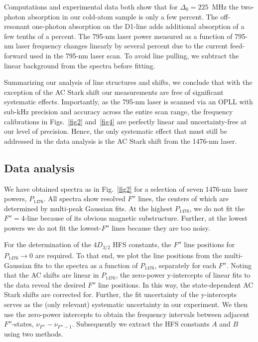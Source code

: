 \documentclass[reprint, amsmath,amssymb, aps, pra, longbibliography]{revtex4-1}
\begin{document}
Computations and experimental data both show that for $\Delta_0=225$~MHz the two-photon absorption in our cold-atom sample is only a few percent. The off-resonant one-photon absorption on the D1-line adds additional absorption of a few tenths of a percent. The 795-nm laser power measured as a function of 795-nm laser frequency changes linearly by several percent due to the current feed-forward used in the 795-nm laser scan. To avoid line pulling, we subtract the linear background from the spectra before fitting. 

Summarizing our analysis of line structures and shifts, we conclude that with the
exception of the AC Stark shift our measurements are free of significant systematic effects.
Importantly, as the 795-nm laser is scanned via an OPLL with sub-kHz precision and accuracy across the entire scan range, the frequency calibrations in Figs.~\ref{fig2} and~\ref{fig4} are perfectly linear and uncertainty-free at our level of precision. Hence, the only systematic effect that must still be addressed in the data analysis is the AC Stark shift from the 1476-nm laser.





\subsection{Data analysis}
\label{subsec:data} 

We have obtained spectra as in Fig.~\ref{fig2} for a selection of seven 1476-nm laser powers, $P_{1476}$. All spectra show resolved $F''$ lines, the centers of which are determined by multi-peak Gaussian fits. At the highest $P_{1476}$, we do not fit the $F''=4$-line because of its obvious magnetic substructure. Further, at the lowest powers we do not fit the lowest-$F''$ lines because they are too noisy.

For the determination of the 4$D_{3/2}$ HFS constants, the $F''$ line positions for $P_{1476} \rightarrow 0$ are required. To that end, we plot the line positions from the multi-Gaussian fits to the spectra as a function of $P_{1476}$, separately for each $F''$.
Noting that the AC shifts are linear in  $P_{1476}$, the zero-power y-intercepts of linear fits to the data reveal the desired 
$F''$ line positions. In this way, the state-dependent AC Stark shifts are corrected for. Further, the fit uncertainty of the
y-intercepts serves as the (only relevant) systematic uncertainty
in our experiment. We then use the zero-power intercepts to obtain the frequency intervals between adjacent $F''$-states, $\nu_{F''} - \nu_{F''-1}$. Subsequently we extract the HFS constants $A$ and $B$ using two methods. 
\end{document}
